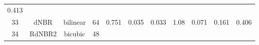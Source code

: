 \documentclass[twoside,12pt,final]{ucthesis-CA2012}
\begin{document}
\begin{ucmainmatter}
\begin{longtable}[]{@{}ccccccccccc@{}}
\begin{minipage}[t]{0.05\columnwidth}
0.413\strut
\end{minipage}\tabularnewline
\begin{minipage}[t]{0.04\columnwidth}\centering\strut
33\strut
\end{minipage} & \begin{minipage}[t]{0.11\columnwidth}\centering\strut
dNBR\strut
\end{minipage} & \begin{minipage}[t]{0.06\columnwidth}\centering\strut
bilinear\strut
\end{minipage} & \begin{minipage}[t]{0.08\columnwidth}\centering\strut
64\strut
\end{minipage} & \begin{minipage}[t]{0.08\columnwidth}\centering\strut
0.751\strut
\end{minipage} & \begin{minipage}[t]{0.07\columnwidth}\centering\strut
0.035\strut
\end{minipage} & \begin{minipage}[t]{0.07\columnwidth}\centering\strut
0.033\strut
\end{minipage} & \begin{minipage}[t]{0.07\columnwidth}\centering\strut
1.08\strut
\end{minipage} & \begin{minipage}[t]{0.05\columnwidth}\centering\strut
0.071\strut
\end{minipage} & \begin{minipage}[t]{0.05\columnwidth}\centering\strut
0.161\strut
\end{minipage} & \begin{minipage}[t]{0.05\columnwidth}\centering\strut
0.406\strut
\end{minipage}\tabularnewline
\begin{minipage}[t]{0.04\columnwidth}\centering\strut
34\strut
\end{minipage} & \begin{minipage}[t]{0.11\columnwidth}\centering\strut
RdNBR2\strut
\end{minipage} & \begin{minipage}[t]{0.06\columnwidth}\centering\strut
bicubic\strut
\end{minipage} & \begin{minipage}[t]{0.08\columnwidth}\centering\strut
48\strut
\end{minipage} & \begin{minipage}[t]{0.08\columnwidth}\centering\strut

\end{minipage}
\end{longtable}
\end{ucmainmatter}
\end{document}
